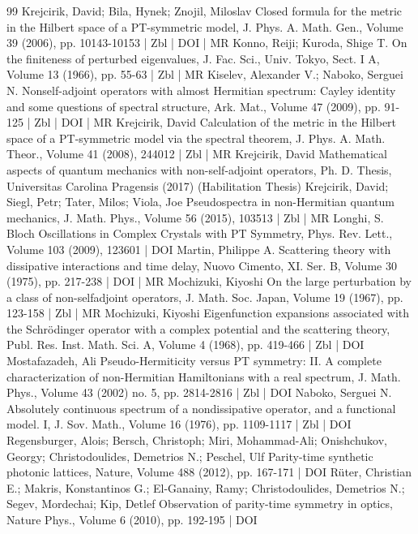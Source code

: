\documentclass[10pt]{amsart}
\theoremstyle{definition}\newtheorem{defi}[theo]{Definition}\newtheorem{rema}[theo]{Remark}\newtheorem{exam}[theo]{Example}\newtheorem{exem}[theo]{Example}\newtheorem{nota}[theo]{Notation}
\begin{document}
\begin{thebibliography}{99}
Krejcirik, David; Bila, Hynek; Znojil, Miloslav Closed formula for the metric in the Hilbert space of a PT-symmetric model, J. Phys. A. Math. Gen., Volume 39 (2006), pp. 10143-10153 | Zbl | DOI | MR
Konno, Reiji; Kuroda, Shige T. On the finiteness of perturbed eigenvalues, J. Fac. Sci., Univ. Tokyo, Sect. I A, Volume 13 (1966), pp. 55-63 | Zbl | MR
Kiselev, Alexander V.; Naboko, Serguei N. Nonself-adjoint operators with almost Hermitian spectrum: Cayley identity and some questions of spectral structure, Ark. Mat., Volume 47 (2009), pp. 91-125 | Zbl | DOI | MR
Krejcirik, David Calculation of the metric in the Hilbert space of a PT-symmetric model via the spectral theorem, J. Phys. A. Math. Theor., Volume 41 (2008), 244012 | Zbl | MR
Krejcirik, David Mathematical aspects of quantum mechanics with non-self-adjoint operators, Ph. D. Thesis, Universitas Carolina Pragensis (2017) (Habilitation Thesis)
Krejcirik, David; Siegl, Petr; Tater, Milos; Viola, Joe Pseudospectra in non-Hermitian quantum mechanics, J. Math. Phys., Volume 56 (2015), 103513 | Zbl | MR
Longhi, S. Bloch Oscillations in Complex Crystals with PT Symmetry, Phys. Rev. Lett., Volume 103 (2009), 123601 | DOI
Martin, Philippe A. Scattering theory with dissipative interactions and time delay, Nuovo Cimento, XI. Ser. B, Volume 30 (1975), pp. 217-238 | DOI | MR
Mochizuki, Kiyoshi On the large perturbation by a class of non-selfadjoint operators, J. Math. Soc. Japan, Volume 19 (1967), pp. 123-158 | Zbl | MR
Mochizuki, Kiyoshi Eigenfunction expansions associated with the Schrödinger operator with a complex potential and the scattering theory, Publ. Res. Inst. Math. Sci. A, Volume 4 (1968), pp. 419-466 | Zbl | DOI
Mostafazadeh, Ali Pseudo-Hermiticity versus PT symmetry: II. A complete characterization of non-Hermitian Hamiltonians with a real spectrum, J. Math. Phys., Volume 43 (2002) no. 5, pp. 2814-2816 | Zbl | DOI
Naboko, Serguei N. Absolutely continuous spectrum of a nondissipative operator, and a functional model. I, J. Sov. Math., Volume 16 (1976), pp. 1109-1117 | Zbl | DOI
Regensburger, Alois; Bersch, Christoph; Miri, Mohammad-Ali; Onishchukov, Georgy; Christodoulides, Demetrios N.; Peschel, Ulf Parity-time synthetic photonic lattices, Nature, Volume 488 (2012), pp. 167-171 | DOI
Rüter, Christian E.; Makris, Konstantinos G.; El-Ganainy, Ramy; Christodoulides, Demetrios N.; Segev, Mordechai; Kip, Detlef Observation of parity-time symmetry in optics, Nature Phys., Volume 6 (2010), pp. 192-195 | DOI

\end{thebibliography}
\end{document}
